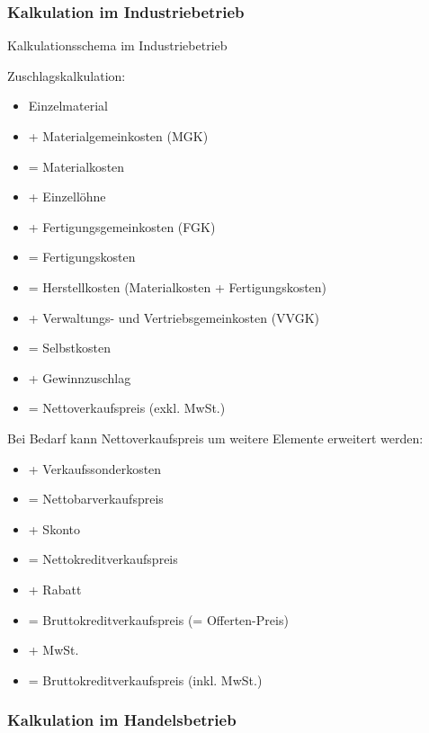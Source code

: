 \subsubsection{Kalkulation im Industriebetrieb}

\begin{KR}{Kalkulationsschema im Industriebetrieb} 
    
Zuschlagskalkulation:
\begin{itemize}
    \item Einzelmaterial
    \item + Materialgemeinkosten (MGK)
    \item = Materialkosten
    \item + Einzellöhne
    \item + Fertigungsgemeinkosten (FGK)
    \item = Fertigungskosten
    \item = Herstellkosten (Materialkosten + Fertigungskosten)
    \item + Verwaltungs- und Vertriebsgemeinkosten (VVGK)
    \item = Selbstkosten
    \item + Gewinnzuschlag
    \item = Nettoverkaufspreis (exkl. MwSt.)
\end{itemize}

Bei Bedarf kann Nettoverkaufspreis um weitere Elemente erweitert werden:
\begin{itemize}
    \item + Verkaufssonderkosten
    \item = Nettobarverkaufspreis
    \item + Skonto
    \item = Nettokreditverkaufspreis
    \item + Rabatt
    \item = Bruttokreditverkaufspreis (= Offerten-Preis)
    \item + MwSt.
    \item = Bruttokreditverkaufspreis (inkl. MwSt.)
\end{itemize}
\end{KR}

\subsubsection{Kalkulation im Handelsbetrieb}

